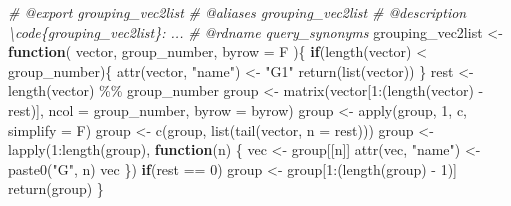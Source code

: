 \documentclass[
]{article}
\newenvironment{Shaded}{\begin{snugshade}}{\end{snugshade}}
\newcommand{\AttributeTok}[1]{\textcolor[rgb]{0.77,0.63,0.00}{#1}}
\newcommand{\CommentTok}[1]{\textcolor[rgb]{0.56,0.35,0.01}{\textit{#1}}}
\newcommand{\ControlFlowTok}[1]{\textcolor[rgb]{0.13,0.29,0.53}{\textbf{#1}}}
\newcommand{\DecValTok}[1]{\textcolor[rgb]{0.00,0.00,0.81}{#1}}
\newcommand{\FunctionTok}[1]{\textcolor[rgb]{0.00,0.00,0.00}{#1}}
\newcommand{\NormalTok}[1]{#1}
\newcommand{\OtherTok}[1]{\textcolor[rgb]{0.56,0.35,0.01}{#1}}
\newcommand{\SpecialCharTok}[1]{\textcolor[rgb]{0.00,0.00,0.00}{#1}}
\newcommand{\StringTok}[1]{\textcolor[rgb]{0.31,0.60,0.02}{#1}}
\begin{document}
\begin{Shaded}
\begin{Highlighting}[]
\CommentTok{\#\textquotesingle{} @export grouping\_vec2list}
\CommentTok{\#\textquotesingle{} @aliases grouping\_vec2list}
\CommentTok{\#\textquotesingle{} @description \textbackslash{}code\{grouping\_vec2list\}: ...}
\CommentTok{\#\textquotesingle{} @rdname query\_synonyms}
\NormalTok{grouping\_vec2list }\OtherTok{\textless{}{-}} 
  \ControlFlowTok{function}\NormalTok{(}
\NormalTok{    vector,}
\NormalTok{    group\_number,}
    \AttributeTok{byrow =}\NormalTok{ F}
\NormalTok{    )\{}
    \ControlFlowTok{if}\NormalTok{(}\FunctionTok{length}\NormalTok{(vector) }\SpecialCharTok{\textless{}}\NormalTok{ group\_number)\{}
      \FunctionTok{attr}\NormalTok{(vector, }\StringTok{"name"}\NormalTok{) }\OtherTok{\textless{}{-}} \StringTok{"G1"}
      \FunctionTok{return}\NormalTok{(}\FunctionTok{list}\NormalTok{(vector))}
\NormalTok{    \}}
\NormalTok{    rest }\OtherTok{\textless{}{-}} \FunctionTok{length}\NormalTok{(vector) }\SpecialCharTok{\%\%}\NormalTok{ group\_number}
\NormalTok{    group }\OtherTok{\textless{}{-}} \FunctionTok{matrix}\NormalTok{(vector[}\DecValTok{1}\SpecialCharTok{:}\NormalTok{(}\FunctionTok{length}\NormalTok{(vector) }\SpecialCharTok{{-}}\NormalTok{ rest)],}
      \AttributeTok{ncol =}\NormalTok{ group\_number,}
      \AttributeTok{byrow =}\NormalTok{ byrow)}
\NormalTok{    group }\OtherTok{\textless{}{-}} \FunctionTok{apply}\NormalTok{(group, }\DecValTok{1}\NormalTok{, c, }\AttributeTok{simplify =}\NormalTok{ F)}
\NormalTok{    group }\OtherTok{\textless{}{-}} \FunctionTok{c}\NormalTok{(group, }\FunctionTok{list}\NormalTok{(}\FunctionTok{tail}\NormalTok{(vector, }\AttributeTok{n =}\NormalTok{ rest)))}
\NormalTok{    group }\OtherTok{\textless{}{-}} \FunctionTok{lapply}\NormalTok{(}\DecValTok{1}\SpecialCharTok{:}\FunctionTok{length}\NormalTok{(group),}
      \ControlFlowTok{function}\NormalTok{(n) \{}
\NormalTok{        vec }\OtherTok{\textless{}{-}}\NormalTok{ group[[n]]}
        \FunctionTok{attr}\NormalTok{(vec, }\StringTok{"name"}\NormalTok{) }\OtherTok{\textless{}{-}} \FunctionTok{paste0}\NormalTok{(}\StringTok{"G"}\NormalTok{, n)}
\NormalTok{        vec}
\NormalTok{      \})}
    \ControlFlowTok{if}\NormalTok{(rest }\SpecialCharTok{==} \DecValTok{0}\NormalTok{)}
\NormalTok{      group }\OtherTok{\textless{}{-}}\NormalTok{ group[}\DecValTok{1}\SpecialCharTok{:}\NormalTok{(}\FunctionTok{length}\NormalTok{(group) }\SpecialCharTok{{-}} \DecValTok{1}\NormalTok{)]}
    \FunctionTok{return}\NormalTok{(group)}
\NormalTok{  \}}


\end{Highlighting}
\end{Shaded}
\end{document}
